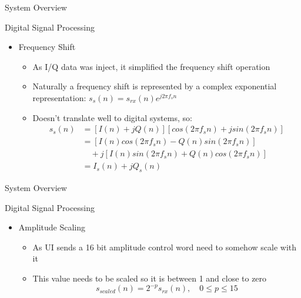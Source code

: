 \begin{frame}{\huge System Overview} 
\begin{block}{Digital Signal Processing }
		\begin{itemize}
			\item Frequency Shift
			\begin{itemize}
				\item As I/Q data was inject, it simplified the frequency shift operation
				\item Naturally a frequency shift is represented by a complex exponential representation: $	s_{s}(n) = s_{rx}(n) e^{j2\pi f_{s}n}$
				\item  Doesn't translate well to digital systems, so: 
				\begin{equation*}
				\label{eq:shift}
				\begin{split}
				s_{s}(n) &= [I(n) +jQ(n)][cos(2\pi f_{s}n) +jsin(2\pi f_{s}n)] \\
				&=  [I(n)cos(2\pi f_{s}n) - Q(n)sin(2\pi f_{s}n)] \\
				&\quad+j[I(n)sin(2\pi f_{s}n) +Q(n)cos(2\pi f_{s}n)]\\
				&= I_s(n) +jQ_s(n)
				\end{split}
				\end{equation*}
			\end{itemize}

		\end{itemize}
	
\end{block}
\end{frame}

\begin{frame}{\huge System Overview} 
	\begin{block}{Digital Signal Processing }
		\begin{itemize}
			\item Amplitude Scaling
			\begin{itemize}
				\item As UI sends a 16 bit amplitude control word need to somehow scale with it
				\item This value needs to be scaled so it is between 1 and close to zero 
				\begin{equation*}
					s_{scaled} (n) = 2^{-p} s_{rx}(n),\quad 0 \leq p \leq 15
				\end{equation*}
			\end{itemize}
		\end{itemize}
	
	\end{block}

\end{frame}

